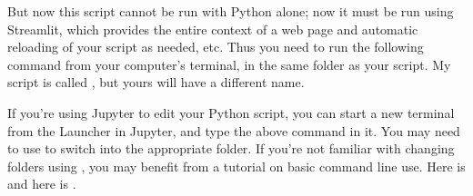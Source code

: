 \documentclass[letterpaper,10pt,english]{sphinxmanual}
\begin{document}
\begin{sphinxVerbatim}[commandchars=\\\{\}]
   
   

  
       

   
  \PYG{p}{[}      \PYG{p}{]}
   

     
     
\end{sphinxVerbatim}

But now this script cannot be run with Python alone; now it must be run using Streamlit, which provides the entire context of a web page and automatic reloading of your script as needed, etc.  Thus you need to run the following command from your computer’s terminal, in the same folder as your script.  My script is called , but yours will have a different name.

\begin{sphinxVerbatim}[commandchars=\\\{\}]
  
\end{sphinxVerbatim}

If you’re using Jupyter to edit your Python script, you can start a new terminal from the Launcher in Jupyter, and type the above command in it.  You may need to use  to switch into the appropriate folder.  If you’re not familiar with changing folders using , you may benefit from a tutorial on basic command line use.  Here is  and here is .
\end{document}
